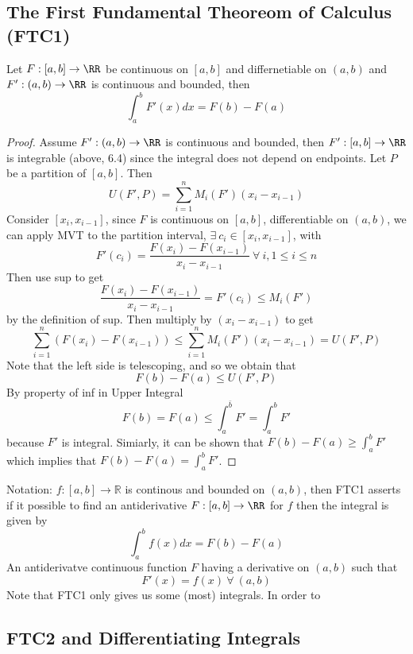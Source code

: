 \documentclass[12pt]{scrartcl}
\begin{document}
\subsection{The First Fundamental Theoreom of Calculus (FTC1)}

\begin{theorem}

  Let $F: [a,b] \to \RR$ be continuous on $[a,b]$ and differnetiable on $(a,b)$ and $F': (a,b) \to \RR$
  is continuous and bounded, then 
  \[\int_a^b F'(x) dx = F(b) - F(a)\]

  \begin{proof}
    Assume $F': (a,b) \to \RR$ is continuous and bounded, then $F': [a,b] \to \RR$ is integrable 
    (above, 6.4) since the integral does not depend on endpoints. Let $P$ be a partition of $[a,b]$. 
    Then 
    \[U(F', P) = \sum_{i=1}^n M_i(F')(x_i - x_{i-1})\]
    Consider $[x_i, x_{i-1}]$, since $F$ is continuous on $[a,b]$, differentiable on $(a,b)$, we can 
    apply MVT to the partition interval, $\exists \ c_i \in [x_i, x_{i-1}]$, with 
    \[F'(c_i) = \frac{F(x_i) - F(x_{i-1})}{x_i - x_{i-1}} \ \forall \ i, 1 \leq i \leq n\]
    Then use sup to get 
    \[\frac{F(x_i) - F(x_{i-1})}{x_i - x_{i-1}} = F'(c_i) \leq M_i(F')\]
    by the definition of sup. Then multiply by $(x_i - x_{i-1})$ to get 
    \[\sum_{i=1}^n (F(x_i) - F(x_{i-1})) \leq \sum_{i=1}^n M_i(F')(x_i - x_{i-1}) = U(F', P)\]
    Note that the left side is telescoping, and so we obtain that 
    \[F(b) - F(a) \leq U(F', P)\]
    By property of inf in Upper Integral
    \[F(b) = F(a) \leq \int_a^{\bar{b}} F' = \int_a^b F'\]
    because $F'$ is integral. 
    Simiarly, it can be shown that $F(b) - F(a) \geq \int_a^b F'$ which implies that 
    $F(b) - F(a) = \int_a^b F'$.
  \end{proof}
\end{theorem}

\begin{note}
  Notation: $f: [a,b] \to \mathbb{R}$ is continous and bounded on $(a,b)$, then 
  FTC1 asserts if it possible to find an antiderivative $F: [a,b] \to \RR$ for $f$
  then the integral is given by
  \[\int_a^b f(x) dx = F(b) - F(a)\]
  An antiderivatve continuous function $F$ having a derivative on $(a,b)$ such that 
  \[F'(x) = f(x) \ \forall \ (a,b)\]
  Note that FTC1 only gives us some (most) integrals. In order to 
\end{note}

\subsection{FTC2 and Differentiating Integrals}
\end{document}
